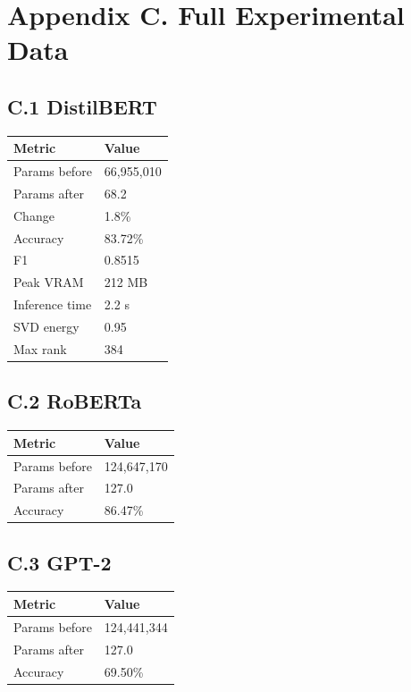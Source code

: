 \section{Appendix C. Full Experimental Data}

\subsection{C.1 DistilBERT}

\begin{table}[H]
\centering
\small
\begin{tabular}{ll}
\toprule
\textbf{Metric} & \textbf{Value} \\
\midrule
Params before & 66,955,010 \\
Params after & 68.2 \\
Change & 1.8\% \\
Accuracy & 83.72\% \\
F1 & 0.8515 \\
Peak VRAM & 212 MB \\
Inference time & 2.2 s \\
SVD energy & 0.95 \\
Max rank & 384 \\
\bottomrule
\end{tabular}
\end{table}

\subsection{C.2 RoBERTa}

\begin{table}[H]
\centering
\small
\begin{tabular}{ll}
\toprule
\textbf{Metric} & \textbf{Value} \\
\midrule
Params before & 124,647,170 \\
Params after & 127.0 \\
Accuracy & 86.47\% \\
\bottomrule
\end{tabular}
\end{table}

\subsection{C.3 GPT-2}

\begin{table}[H]
\centering
\small
\begin{tabular}{ll}
\toprule
\textbf{Metric} & \textbf{Value} \\
\midrule
Params before & 124,441,344 \\
Params after & 127.0 \\
Accuracy & 69.50\% \\
\bottomrule
\end{tabular}
\end{table}


